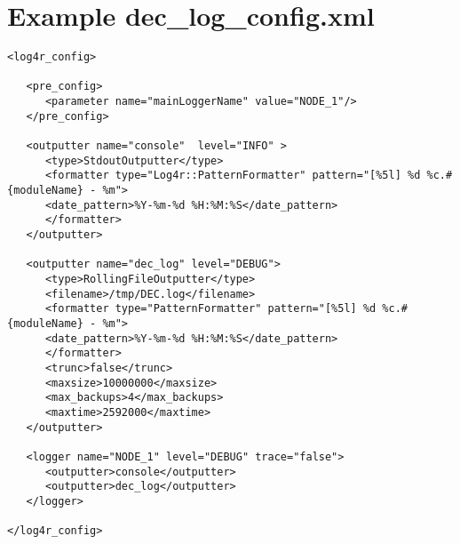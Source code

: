\documentclass[dec_sum_main.tex]{subfiles}
\begin{document}
\pagebreak
\section{Example dec\_log\_config.xml}
\begin{verbatim}
<log4r_config>

   <pre_config>
      <parameter name="mainLoggerName" value="NODE_1"/>
   </pre_config>

   <outputter name="console"  level="INFO" >
      <type>StdoutOutputter</type>
      <formatter type="Log4r::PatternFormatter" pattern="[%5l] %d %c.#{moduleName} - %m">
      <date_pattern>%Y-%m-%d %H:%M:%S</date_pattern>
      </formatter>
   </outputter>

   <outputter name="dec_log" level="DEBUG">
      <type>RollingFileOutputter</type>
      <filename>/tmp/DEC.log</filename>
      <formatter type="PatternFormatter" pattern="[%5l] %d %c.#{moduleName} - %m">
      <date_pattern>%Y-%m-%d %H:%M:%S</date_pattern>
      </formatter>
      <trunc>false</trunc>
      <maxsize>10000000</maxsize>
      <max_backups>4</max_backups>
      <maxtime>2592000</maxtime>
   </outputter>

   <logger name="NODE_1" level="DEBUG" trace="false">
      <outputter>console</outputter>
      <outputter>dec_log</outputter>
   </logger>

</log4r_config>

\end{verbatim}
\end{document}
